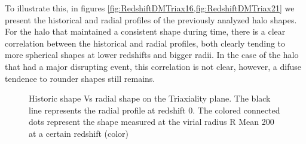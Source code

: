 To illustrate this, in figures \ref{fig:RedshiftDMTriax16,fig:RedshiftDMTriax21} we present the historical and radial profiles of the previously analyzed halo shapes. For the halo that maintained a consistent shape during time, there is a clear correlation between the historical and radial profiles, both clearly tending to more spherical shapes at lower redshifts and bigger radii. In the case of the halo that had a major disrupting event, this correlation is not clear, however, a difuse tendence to rounder shapes still remains.\\  

\begin{figure}[!ht]
  \centering
  \hfill
  \caption{Historic shape Vs radial shape on the Triaxiality plane. The black line represents the radial profile at redshift 0. The colored connected dots represent the shape measured at the virial radius R Mean 200 at a certain redshift (color)}
\end{figure}







 
